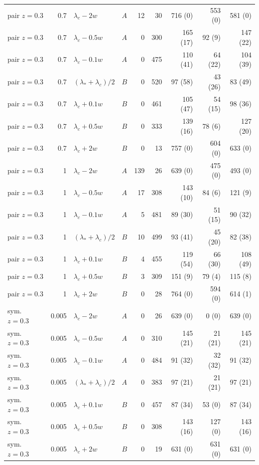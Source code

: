 \begin{longtable}{@{}lrllrrrrr@{}}
pair $z{=}0.3$ & 0.7 & $\lambda_c-2w$ & $A$ & 12 & 30 & 716 (0) & 553 (0) & 581 (0)\\
pair $z{=}0.3$ & 0.7 & $\lambda_c-0.5w$ & $A$ & 0 & 300 & 165 (17) & 92 (9) & 147 (22)\\
pair $z{=}0.3$ & 0.7 & $\lambda_c-0.1w$ & $A$ & 0 & 475 & 110 (41) & 64 (22) & 104 (39)\\
pair $z{=}0.3$ & 0.7 & $(\lambda_*+\lambda_c)/2$ & $B$ & 0 & 520 & 97 (58) & 43 (26) & 83 (49)\\
pair $z{=}0.3$ & 0.7 & $\lambda_c+0.1w$ & $B$ & 0 & 461 & 105 (47) & 54 (15) & 98 (36)\\
pair $z{=}0.3$ & 0.7 & $\lambda_c+0.5w$ & $B$ & 0 & 333 & 139 (16) & 78 (6) & 127 (20)\\
pair $z{=}0.3$ & 0.7 & $\lambda_c+2w$ & $B$ & 0 & 13 & 757 (0) & 604 (0) & 633 (0)\\
pair $z{=}0.3$ & 1 & $\lambda_c-2w$ & $A$ & 139 & 26 & 639 (0) & 475 (0) & 493 (0)\\
pair $z{=}0.3$ & 1 & $\lambda_c-0.5w$ & $A$ & 17 & 308 & 143 (10) & 84 (6) & 121 (9)\\
pair $z{=}0.3$ & 1 & $\lambda_c-0.1w$ & $A$ & 5 & 481 & 89 (30) & 51 (15) & 90 (32)\\
pair $z{=}0.3$ & 1 & $(\lambda_*+\lambda_c)/2$ & $B$ & 10 & 499 & 93 (41) & 45 (20) & 82 (38)\\
pair $z{=}0.3$ & 1 & $\lambda_c+0.1w$ & $B$ & 4 & 455 & 119 (54) & 66 (30) & 108 (49)\\
pair $z{=}0.3$ & 1 & $\lambda_c+0.5w$ & $B$ & 3 & 309 & 151 (9) & 79 (4) & 115 (8)\\
pair $z{=}0.3$ & 1 & $\lambda_c+2w$ & $B$ & 0 & 28 & 764 (0) & 594 (0) & 614 (1)\\
sym. $z{=}0.3$ & 0.005 & $\lambda_c-2w$ & $A$ & 0 & 26 & 639 (0) & 0 (0) & 639 (0)\\
sym. $z{=}0.3$ & 0.005 & $\lambda_c-0.5w$ & $A$ & 0 & 310 & 145 (21) & 21 (21) & 145 (21)\\
sym. $z{=}0.3$ & 0.005 & $\lambda_c-0.1w$ & $A$ & 0 & 484 & 91 (32) & 32 (32) & 91 (32)\\
sym. $z{=}0.3$ & 0.005 & $(\lambda_*+\lambda_c)/2$ & $A$ & 0 & 383 & 97 (21) & 21 (21) & 97 (21)\\
sym. $z{=}0.3$ & 0.005 & $\lambda_c+0.1w$ & $B$ & 0 & 457 & 87 (34) & 53 (0) & 87 (34)\\
sym. $z{=}0.3$ & 0.005 & $\lambda_c+0.5w$ & $B$ & 0 & 308 & 143 (16) & 127 (0) & 143 (16)\\
sym. $z{=}0.3$ & 0.005 & $\lambda_c+2w$ & $B$ & 0 & 19 & 631 (0) & 631 (0) & 631 (0)\\

\end{longtable}
